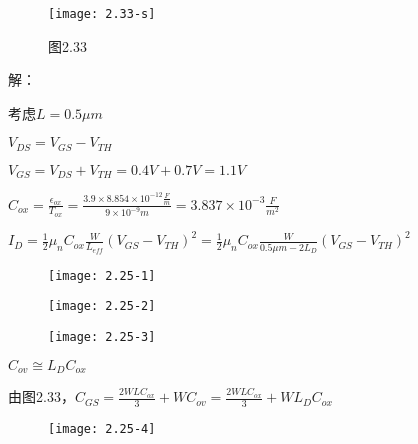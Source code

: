 




		\begin{figure}[H] %
	\begin{minipage}{\linewidth}
		\texttt{[image: 2.33-s]}
	\end{minipage}
	\caption*{图2.33} %
\end{figure}

解：

考虑$L=0.5\mu m$

$V_{DS}=V_{GS}-V_{TH}$

$V_{GS}=V_{DS}+V_{TH}=0.4V+0.7V=1.1V$

$C_{ox}=\frac{\epsilon_{ox}}{T_{ox}}=\frac{3.9 \times 8.854 \times 10^{-12}\frac{F}{m}}{9 \times 10^{-9}m}=3.837 \times 10^{-3}\frac{F}{m^2}$

$I_D=\frac{1}{2}\mu_nC_{ox}\frac{W}{L_{eff}}(V_{GS}-V_{TH})^2=\frac{1}{2}\mu_nC_{ox}\frac{W}{0.5\mu m-2L_D}(V_{GS}-V_{TH})^2$

\begin{figure}[H] %
	\begin{minipage}{\linewidth}
		\texttt{[image: 2.25-1]}
	\end{minipage}
\end{figure}

\begin{figure}[H] %
	\begin{minipage}{\linewidth}
		\texttt{[image: 2.25-2]}
	\end{minipage}
\end{figure}

\begin{figure}[H] %
	\begin{minipage}{\linewidth}
		\texttt{[image: 2.25-3]}
	\end{minipage}
\end{figure}

$C_{ov}\cong L_DC_{ox}$

由图2.33，$C_{GS}=\frac{2WLC_{ox}}{3}+WC_{ov}=\frac{2WLC_{ox}}{3}+WL_DC_{ox}$

\begin{figure}[H] %
	\begin{minipage}{\linewidth}
		\texttt{[image: 2.25-4]}
	\end{minipage}
\end{figure}

